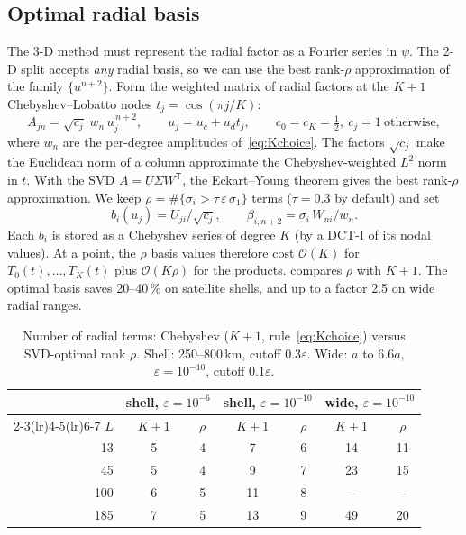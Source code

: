 \documentclass[11pt,a4paper]{article}
\theoremstyle{remark}
\newcommand{\eps}{\varepsilon}
\newcommand{\Oh}{\mathcal{O}}
\begin{document}
\subsection{Optimal radial basis}\label{sec:svd}
The 3-D method must represent the radial factor as a Fourier series in $\psi$. The 2-D split
accepts \emph{any} radial basis, so we can use the best rank-$\rho$ approximation of the
family $\{u^{n+2}\}$. Form the weighted matrix of radial factors at the $K+1$
Chebyshev--Lobatto nodes $t_j=\cos(\pi j/K)$:
\begin{equation}
A_{jn}=\sqrt{c_j}\;w_n\,u_j^{\,n+2},\qquad u_j=u_c+u_dt_j,\qquad c_0=c_K=\tfrac12,\ c_j=1\ \text{otherwise},
\end{equation}
where $w_n$ are the per-degree amplitudes of~\eqref{eq:Kchoice}. The factors $\sqrt{c_j}$ make the
Euclidean norm of a column approximate the Chebyshev-weighted $L^2$ norm in $t$. With the SVD
$A=U\Sigma W^{\mathsf T}$, the Eckart--Young theorem gives the best rank-$\rho$ approximation. We keep
$\rho=\#\{\sigma_i>\tau\,\eps\,\sigma_1\}$ terms ($\tau=0.3$ by default) and set
\begin{equation}
b_i(u_j)=U_{ji}/\sqrt{c_j},\qquad \beta_{i,n+2}=\sigma_i\,W_{ni}/w_n .
\end{equation}
Each $b_i$ is stored as a Chebyshev series of degree $K$ (by a DCT-I of its nodal values). At a point,
the $\rho$ basis values therefore cost $\Oh(K)$ for $T_0(t),\dots,T_K(t)$ plus $\Oh(K\rho)$ for the
products.  compares $\rho$ with $K+1$. The optimal basis saves 20--40\,\% on satellite
shells, and up to a factor 2.5 on wide radial ranges.

\begin{table}[!htbp]\centering\small
\caption{Number of radial terms: Chebyshev ($K+1$, rule~\eqref{eq:Kchoice}) versus SVD-optimal rank $\rho$.
Shell: 250--800\,km, cutoff $0.3\eps$. Wide: $a$ to $6.6a$, $\eps=10^{-10}$, cutoff $0.1\eps$.}\label{tab:rank}
\begin{tabular}{rcccccc}\toprule
&\multicolumn{2}{c}{shell, $\eps=10^{-6}$}&\multicolumn{2}{c}{shell, $\eps=10^{-10}$}&\multicolumn{2}{c}{wide, $\eps=10^{-10}$}\\
\cmidrule(lr){2-3}\cmidrule(lr){4-5}\cmidrule(lr){6-7}
$L$&$K+1$&$\rho$&$K+1$&$\rho$&$K+1$&$\rho$\\\midrule
13&5&4&7&6&14&11\\
45&5&4&9&7&23&15\\
100&6&5&11&8&--&--\\
185&7&5&13&9&49&20\\\bottomrule
\end{tabular}
\end{table}
\end{document}
